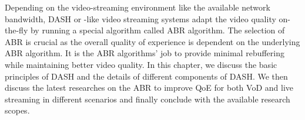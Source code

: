 Depending on the video-streaming environment like the available network bandwidth, \ac{DASH} or -like video streaming systems adapt the video quality on-the-fly by running a special algorithm called \ac{ABR} algorithm. The selection of \ac{ABR} is crucial as the overall quality of experience is dependent on the underlying \ac{ABR} algorithm. It is the \ac{ABR} algorithms' job to provide minimal rebuffering while maintaining better video quality. In this chapter, we discuss the basic principles of \ac{DASH} and the details of different components of \ac{DASH}.  We then discuss the latest researches on the \ac{ABR} to improve \ac{QoE} for both {VoD} and live streaming in different scenarios and finally conclude with the available research scopes.

